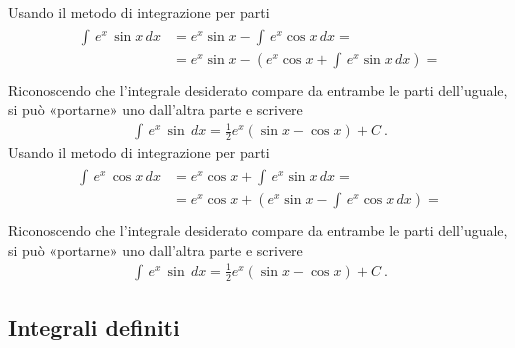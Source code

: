 \documentclass[letterpaper,10pt,italian]{jupyterBook}
\begin{document}
\sphinxAtStartPar
{} Usando il metodo di integrazione per parti
\begin{equation*}
\begin{split}\begin{aligned}
  \int \, e^x \, \sin x \, dx 
  & = e^x \sin x - \int \, e^x \cos x \, dx = \\
  & = e^x \sin x - \left( e^x \cos x + \int \, e^x \sin x \, dx \right) = \\
\end{aligned}\end{split}
\end{equation*}
\sphinxAtStartPar
Riconoscendo che l’integrale desiderato compare da entrambe le parti dell’uguale, si può «portarne» uno dall’altra parte e scrivere
\begin{equation*}
\begin{split}\int \, e^x \, \sin \, dx = \frac{1}{2} e^{x} \left( \sin x - \cos x \right) + C \ .\end{split}
\end{equation*}
\sphinxAtStartPar
{} Usando il metodo di integrazione per parti
\begin{equation*}
\begin{split}\begin{aligned}
  \int \, e^x \, \cos x \, dx 
  & = e^x \cos x + \int \, e^x \sin x \, dx = \\
  & = e^x \cos x + \left( e^x \sin x - \int \, e^x \cos x \, dx \right) = \\
\end{aligned}\end{split}
\end{equation*}
\sphinxAtStartPar
Riconoscendo che l’integrale desiderato compare da entrambe le parti dell’uguale, si può «portarne» uno dall’altra parte e scrivere
\begin{equation*}
\begin{split}\int \, e^x \, \sin \, dx = \frac{1}{2} e^{x} \left( \sin x - \cos x \right) + C \ .\end{split}
\end{equation*}

\subsection{Integrali definiti}
\label{\detokenize{ch/infinitesimal_calculus/integrals-problems:integrali-definiti}} \label{exercise:ex:integrals:definite}
\end{document}
